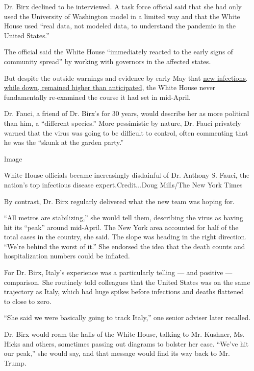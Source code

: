 Dr. Birx declined to be interviewed. A task force official said that she
had only used the University of Washington model in a limited way and
that the White House used ``real data, not modeled data, to understand
the pandemic in the United States.''

The official said the White House ``immediately reacted to the early
signs of community spread'' by working with governors in the affected
states.

But despite the outside warnings and evidence by early May that
\href{https://www.nytimes3xbfgragh.onion/interactive/2020/us/coronavirus-us-cases.html}{new
infections, while down, remained higher than anticipated}, the White
House never fundamentally re-examined the course it had set in
mid-April.

Dr. Fauci, a friend of Dr. Birx's for 30 years, would describe her as
more political than him, a ``different species.'' More pessimistic by
nature, Dr. Fauci privately warned that the virus was going to be
difficult to control, often commenting that he was the ``skunk at the
garden party.''

Image

White House officials became increasingly disdainful of Dr. Anthony S.
Fauci, the nation's top infectious disease expert.Credit...Doug
Mills/The New York Times

By contrast, Dr. Birx regularly delivered what the new team was hoping
for.

``All metros are stabilizing,'' she would tell them, describing the
virus as having hit its ``peak'' around mid-April. The New York area
accounted for half of the total cases in the country, she said. The
slope was heading in the right direction. ``We're behind the worst of
it.'' She endorsed the idea that the death counts and hospitalization
numbers could be inflated.

For Dr. Birx, Italy's experience was a particularly telling --- and
positive --- comparison. She routinely told colleagues that the United
States was on the same trajectory as Italy, which had huge spikes before
infections and deaths flattened to close to zero.

``She said we were basically going to track Italy,'' one senior adviser
later recalled.

Dr. Birx would roam the halls of the White House, talking to Mr.
Kushner, Ms. Hicks and others, sometimes passing out diagrams to bolster
her case. ``We've hit our peak,'' she would say, and that message would
find its way back to Mr. Trump.

